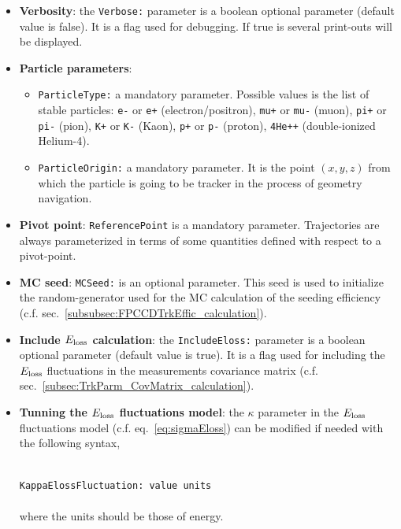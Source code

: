 \begin{itemize}
 \item  {\bf Verbosity}: the {\tt Verbose:} parameter is a boolean optional parameter (default value is false). It is a flag used for debugging. 
 If true is several print-outs will be displayed.

 \item  {\bf Particle parameters}:
 \begin{itemize}
   \item {\tt ParticleType:} a mandatory parameter. Possible values is the list of stable particles: {\tt e-} or {\tt e+} (electron/positron), 
   {\tt mu+} or {\tt mu-} (muon), {\tt pi+} or {\tt pi-} (pion), {\tt K+} or {\tt K-} (Kaon), {\tt p+} or {\tt p-} (proton), {\tt 4He++} (double-ionized Helium-4).
   
   \item  {\tt ParticleOrigin:} a mandatory parameter. It is the point $(x,y,z)$ from which the particle is going to be tracker in the process of
   geometry navigation.
 \end{itemize}
   
 \item  {\bf Pivot point}: {\tt ReferencePoint} is a mandatory parameter. Trajectories are always parameterized in terms of some quantities defined with respect to
 a pivot-point.
 
 \item  {\bf MC seed}: {\tt MCSeed:} is an optional parameter. This seed is used to initialize the random-generator used for the MC calculation of the seeding 
 efficiency (c.f. sec.~\ref{subsubsec:FPCCDTrkEffic_calculation}).
 
 \item  {\bf Include $E_{\rm loss}$ calculation}: the {\tt IncludeEloss:} parameter is a boolean optional parameter (default value is true). It is a flag used for including 
 the $E_{\rm loss}$ fluctuations in the measurements covariance matrix (c.f. sec.~\ref{subsec:TrkParm_CovMatrix_calculation}).
 
 \item  {\bf Tunning the $E_{\rm loss}$ fluctuations model}: the $\kappa$ parameter in the $E_{\rm loss}$ fluctuations model (c.f. eq.~\ref{eq:sigmaEloss}) can be modified if needed 
 with the following syntax,
 
 ~\\
 \noindent     
 {\tt KappaElossFluctuation:  value units} \\
 ~\\
 \noindent
 where the units should be those of energy.
 

\end{itemize}
